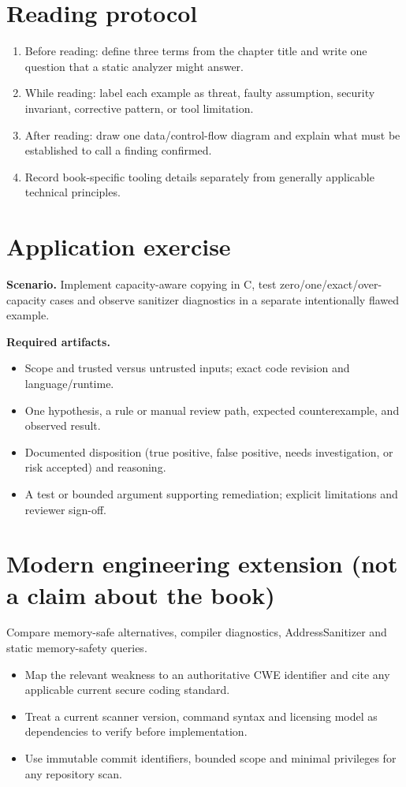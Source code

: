 \documentclass[10pt,letterpaper]{article}
\begin{document}
\section{Reading protocol}
\begin{enumerate}
\item Before reading: define three terms from the chapter title and write one question that a static analyzer might answer.
\item While reading: label each example as threat, faulty assumption, security invariant, corrective pattern, or tool limitation.
\item After reading: draw one data/control-flow diagram and explain what must be established to call a finding confirmed.
\item Record book-specific tooling details separately from generally applicable technical principles.
\end{enumerate}

\section{Application exercise}
\textbf{Scenario.} Implement capacity-aware copying in C, test zero/one/exact/over-capacity cases and observe sanitizer diagnostics in a separate intentionally flawed example.

\textbf{Required artifacts.}\begin{itemize}
\item Scope and trusted versus untrusted inputs; exact code revision and language/runtime.
\item One hypothesis, a rule or manual review path, expected counterexample, and observed result.
\item Documented disposition (true positive, false positive, needs investigation, or risk accepted) and reasoning.
\item A test or bounded argument supporting remediation; explicit limitations and reviewer sign-off.
\end{itemize}

\section{Modern engineering extension (not a claim about the book)}
Compare memory-safe alternatives, compiler diagnostics, AddressSanitizer and static memory-safety queries.

\begin{itemize}
\item Map the relevant weakness to an authoritative CWE identifier and cite any applicable current secure coding standard.
\item Treat a current scanner version, command syntax and licensing model as dependencies to verify before implementation.
\item Use immutable commit identifiers, bounded scope and minimal privileges for any repository scan.
\end{itemize}
\end{document}
